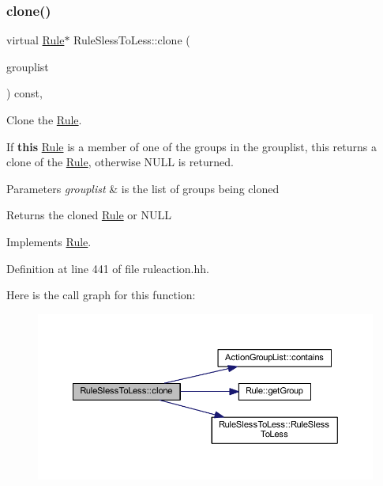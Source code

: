 \subsubsection{\texorpdfstring{clone()}{clone()}}
{\footnotesize\ttfamily virtual \mbox{\hyperlink{class_rule}{Rule}}$\ast$ Rule\+Sless\+To\+Less\+::clone (\begin{DoxyParamCaption}\item[{const \mbox{\hyperlink{class_action_group_list}{Action\+Group\+List}} \&}]{grouplist }\end{DoxyParamCaption}) const\hspace{0.3cm}{\ttfamily [inline]}, {\ttfamily [virtual]}}



Clone the \mbox{\hyperlink{class_rule}{Rule}}. 

If {\bfseries{this}} \mbox{\hyperlink{class_rule}{Rule}} is a member of one of the groups in the grouplist, this returns a clone of the \mbox{\hyperlink{class_rule}{Rule}}, otherwise N\+U\+LL is returned. 
\begin{DoxyParams}{Parameters}
{\em grouplist} & is the list of groups being cloned \\
\hline
\end{DoxyParams}
\begin{DoxyReturn}{Returns}
the cloned \mbox{\hyperlink{class_rule}{Rule}} or N\+U\+LL 
\end{DoxyReturn}


Implements \mbox{\hyperlink{class_rule_a70de90a76461bfa7ea0b575ce3c11e4d}{Rule}}.



Definition at line 441 of file ruleaction.\+hh.

Here is the call graph for this function\+:
\nopagebreak
\begin{figure}[H]
\begin{center}
\leavevmode
\includegraphics[width=350pt]{class_rule_sless_to_less_a6d17357335c8beaa9c06daa55f9b7fc9_cgraph}
\end{center}
\end{figure}
\mbox{\label{class_rule_sless_to_less_acb3c7fb8478b129c45380af2aa987b24}} 
